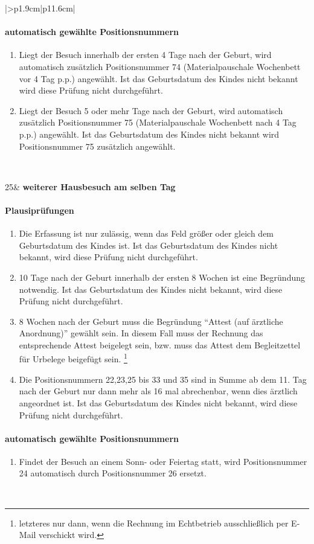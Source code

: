 \begin{mpsupertabular}{|>{\centering}p{1.9cm}|p{11.6cm}|}
\paragraph{automatisch gewählte Positionsnummern}
\begin{enumerate}
\item
Liegt der Besuch innerhalb der ersten 4 Tage nach der Geburt, wird
automatisch zusätzlich Positionsnummer 74 (Materialpauschale Wochenbett
vor 4 Tag p.p.) angewählt. Ist das Geburtsdatum des Kindes nicht bekannt
wird diese Prüfung nicht durchgeführt.
\item
Liegt der Besuch 5 oder mehr Tage nach der Geburt, wird
automatisch zusätzlich Positionsnummer 75 (Materialpauschale Wochenbett
nach 4 Tag p.p.) angewählt. Ist das Geburtsdatum des Kindes nicht bekannt
wird Positionsnummer 75 zusätzlich angewählt.
\end{enumerate}
\\ \hline


25&
\textbf{weiterer Hausbesuch am selben Tag}
\paragraph{Plausiprüfungen}
\begin{enumerate}
\item
Die Erfassung ist nur zulässig, wenn das Feld  größer 
oder gleich dem Geburtsdatum des Kindes ist. Ist das Geburtsdatum des
Kindes nicht bekannt, wird diese Prüfung nicht durchgeführt.
\item
10 Tage nach der Geburt innerhalb der ersten 8 Wochen ist eine
Begründung notwendig. Ist das Geburtsdatum des
Kindes nicht bekannt, wird diese Prüfung nicht durchgeführt.
\item
8 Wochen nach der Geburt muss die Begründung ``Attest (auf ärztliche
Anordnung)'' gewählt sein. In diesem Fall muss der Rechnung das
entsprechende Attest beigelegt sein, bzw. muss das Attest dem
Begleitzettel für Urbelege beigefügt sein.
\footnote{letzteres nur dann, wenn die Rechnung im Echtbetrieb
ausschließlich per E-Mail verschickt wird.}
\item
Die Positionsnummern 22,23,25 bis 33 und 35 sind in Summe ab dem 11. Tag 
nach der Geburt nur dann mehr 
als 16 mal abrechenbar, wenn dies ärztlich angeordnet ist.
 Ist das Geburtsdatum des
Kindes nicht bekannt, wird diese Prüfung nicht durchgeführt.
\end{enumerate}
\paragraph{automatisch gewählte Positionsnummern}
\begin{enumerate}
\item
Findet der Besuch an einem Sonn- oder Feiertag statt, wird 
Positionsnummer 24 automatisch durch Positionsnummer 26 ersetzt.
\end{enumerate}
\\ \hline



\end{mpsupertabular}
